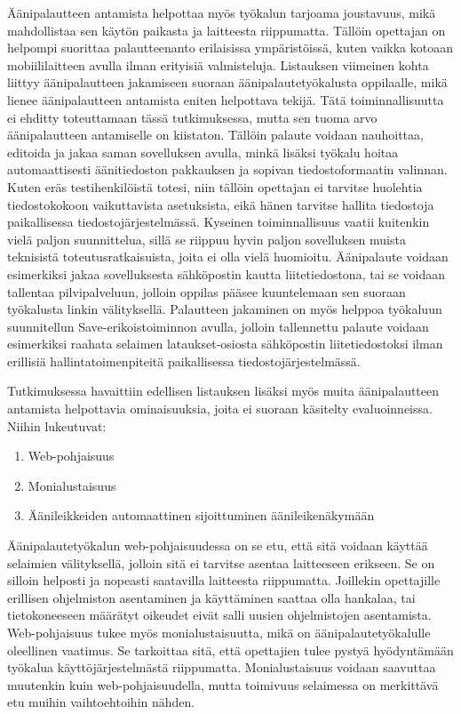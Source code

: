 \documentclass[utf8]{gradu3}
\begin{document}
Äänipalautteen antamista helpottaa myös työkalun tarjoama joustavuus, mikä mahdollistaa sen käytön paikasta ja laitteesta riippumatta. Tällöin opettajan on helpompi suorittaa palautteenanto erilaisissa ympäristöissä, kuten vaikka kotoaan mobiililaitteen avulla ilman erityisiä valmisteluja. Listauksen viimeinen kohta liittyy äänipalautteen jakamiseen suoraan äänipalautetyökalusta oppilaalle, mikä lienee äänipalautteen antamista eniten helpottava tekijä. Tätä toiminnallisuutta ei ehditty toteuttamaan tässä tutkimuksessa, mutta sen tuoma arvo äänipalautteen antamiselle on kiistaton. Tällöin palaute voidaan nauhoittaa, editoida ja jakaa saman sovelluksen avulla, minkä lisäksi työkalu hoitaa automaattisesti äänitiedoston pakkauksen ja sopivan tiedostoformaatin valinnan. Kuten eräs testihenkilöistä totesi, niin tällöin opettajan ei tarvitse huolehtia tiedostokokoon vaikuttavista asetuksista, eikä hänen tarvitse hallita tiedostoja paikallisessa tiedostojärjestelmässä. Kyseinen toiminnallisuus vaatii kuitenkin vielä paljon suunnittelua, sillä se riippuu hyvin paljon sovelluksen muista teknisistä toteutusratkaisuista, joita ei olla vielä huomioitu. Äänipalaute voidaan esimerkiksi jakaa sovelluksesta sähköpostin kautta liitetiedostona, tai se voidaan tallentaa pilvipalveluun, jolloin oppilas pääsee kuuntelemaan sen suoraan työkalusta linkin välityksellä. Palautteen jakaminen on myös helppoa työkaluun suunnitellun Save-erikoistoiminnon avulla, jolloin tallennettu palaute voidaan esimerkiksi raahata selaimen lataukset-osiosta sähköpostin liitetiedostoksi ilman erillisiä hallintatoimenpiteitä paikallisessa tiedostojärjestelmässä.

Tutkimuksessa havaittiin edellisen listauksen lisäksi myös muita äänipalautteen antamista helpottavia ominaisuuksia, joita ei suoraan käsitelty evaluoinneissa. Niihin lukeutuvat:

\begin{enumerate}
  \item Web-pohjaisuus
  \item Monialustaisuus
  \item Äänileikkeiden automaattinen sijoittuminen äänileikenäkymään
\end{enumerate}

Äänipalautetyökalun web-pohjaisuudessa on se etu, että sitä voidaan käyttää selaimien välityksellä, jolloin sitä ei tarvitse asentaa laitteeseen erikseen. Se on silloin helposti ja nopeasti saatavilla laitteesta riippumatta. Joillekin opettajille erillisen ohjelmiston asentaminen ja käyttäminen saattaa olla hankalaa, tai tietokoneeseen määrätyt oikeudet eivät salli uusien ohjelmistojen asentamista. Web-pohjaisuus tukee myös monialustaisuutta, mikä on äänipalautetyökalulle oleellinen vaatimus. Se tarkoittaa sitä, että opettajien tulee pystyä hyödyntämään työkalua käyttöjärjestelmästä riippumatta. Monialustaisuus voidaan saavuttaa muutenkin kuin web-pohjaisuudella, mutta toimivuus selaimessa on merkittävä etu muihin vaihtoehtoihin nähden.
\end{document}
